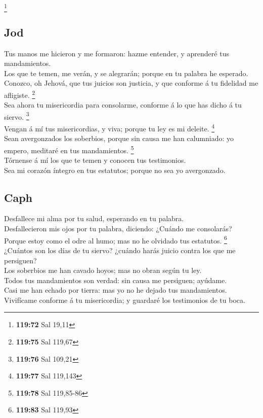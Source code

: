 \footnote{\textbf{119:72} Sal 19,11}

\hypertarget{jod}{%
\subsection{Jod}\label{jod}}

 Tus manos me hicieron y me formaron: hazme entender, y
aprenderé tus mandamientos.\\
 Los que te temen, me verán, y se alegrarán; porque en tu
palabra he esperado.\\
 Conozco, oh Jehová, que tus juicios son justicia, y que
conforme á tu fidelidad me afligiste. \footnote{\textbf{119:75} Sal
  119,67}\\
 Sea ahora tu misericordia para consolarme, conforme á lo
que has dicho á tu siervo. \footnote{\textbf{119:76} Sal 109,21}\\
 Vengan á mí tus misericordias, y viva; porque tu ley es mi
deleite. \footnote{\textbf{119:77} Sal 119,143}\\
 Sean avergonzados los soberbios, porque sin causa me han
calumniado: yo empero, meditaré en tus mandamientos. \footnote{\textbf{119:78}
  Sal 119,85-86}\\
 Tórnense á mí los que te temen y conocen tus
testimonios.\\
 Sea mi corazón íntegro en tus estatutos; porque no sea yo
avergonzado.

\hypertarget{caph}{%
\subsection{Caph}\label{caph}}

 Desfallece mi alma por tu salud, esperando en tu
palabra.\\
 Desfallecieron mis ojos por tu palabra, diciendo: ¿Cuándo
me consolarás?\\
 Porque estoy como el odre al humo; mas no he olvidado tus
estatutos. \footnote{\textbf{119:83} Sal 119,93}\\
 ¿Cuántos son los días de tu siervo? ¿cuándo harás juicio
contra los que me persiguen?\\
 Los soberbios me han cavado hoyos; mas no obran según tu
ley.\\
 Todos tus mandamientos son verdad: sin causa me persiguen;
ayúdame.\\
 Casi me han echado por tierra: mas yo no he dejado tus
mandamientos.\\
 Vivifícame conforme á tu misericordia; y guardaré los
testimonios de tu boca.


